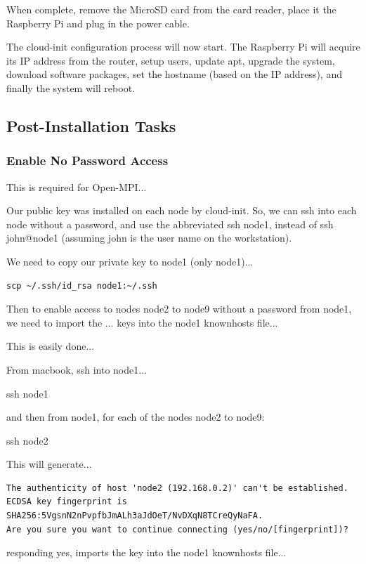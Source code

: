 \documentclass{article}
\begin{document}
When complete, remove the MicroSD card from the card reader, place it the Raspberry Pi and plug in the power cable.

The cloud-init configuration process will now start. The Raspberry Pi will acquire its IP address from the router, setup users, update apt, upgrade the system, download software packages, set the hostname (based on the IP address), and finally the system will reboot.


\subsection{Post-Installation Tasks}

\subsubsection{Enable No Password Access}

This is required for Open-MPI...

Our public key was installed on each node by cloud-init. So, we can ssh into each node without a password, and use the abbreviated ssh node1, instead of ssh john@node1 (assuming john is the user name on the workstation).

We need to copy our private key to node1 (only node1)...

\begin{lstlisting}[]
scp ~/.ssh/id_rsa node1:~/.ssh
\end{lstlisting}

Then to enable access to nodes node2 to node9 without a password from node1, we need to import the ... keys into the node1 knownhosts file...

This is easily done...

From macbook, ssh into node1...

ssh node1

and then from node1, for each of the nodes node2 to node9:

ssh node2

This will generate...

\begin{lstlisting}[]
The authenticity of host 'node2 (192.168.0.2)' can't be established.
ECDSA key fingerprint is SHA256:5VgsnN2nPvpfbJmALh3aJdOeT/NvDXqN8TCreQyNaFA.
Are you sure you want to continue connecting (yes/no/[fingerprint])?
\end{lstlisting}

responding yes, imports the key into the node1 knownhosts file...
\end{document}
